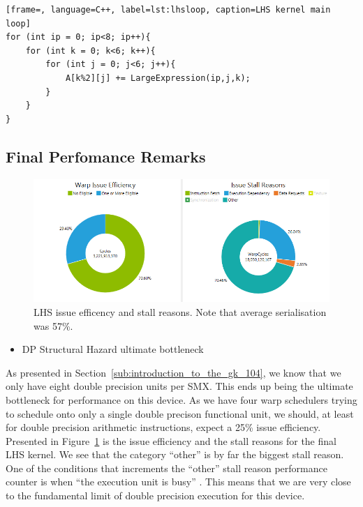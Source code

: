 \documentclass[11pt, oneside, a4paper]{article}
\begin{document}
\begin{lstlisting}[frame=, language=C++, label=lst:lhsloop, caption=LHS kernel main loop]
for (int ip = 0; ip<8; ip++){
	for (int k = 0; k<6; k++){
		for (int j = 0; j<6; j++){
			A[k%2][j] += LargeExpression(ip,j,k);
		}
	}
}
\end{lstlisting}


\subsection{Final Perfomance Remarks} %
\label{sub:final_performance_remarks}

\begin{figure}[tb]
	\begin{center}
		\includegraphics[width=\textwidth]{"LHS efficency and stall reason"}
	\end{center}
	\caption{LHS issue efficency and stall reasons. Note that average serialisation was 57\%.}
	\label{fig:issue_eff_and_stall_reasons}
\end{figure}

\begin{itemize}
	\item DP Structural Hazard ultimate bottleneck
\end{itemize}

As presented in Section~\ref{sub:introduction_to_the_gk_104}, we know that we only have eight double precision units per SMX. This ends up being the ultimate bottleneck for performance on this device.
As we have four warp schedulers trying to schedule onto only a single double precison functional unit, we should, at least for double precision arithmetic instructions, expect a 25\% issue efficiency.
Presented in Figure~\ref{fig:issue_eff_and_stall_reasons} is the issue efficiency and the stall reasons for the final LHS kernel.
We see that the category ``other'' is by far the biggest stall reason. One of the conditions that increments the ``other'' stall reason performance counter is when ``the execution unit is busy'' \cite{IssueStallOther}.
This means that we are very close to the fundamental limit of double precision execution for this device.
\end{document}
